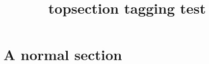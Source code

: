 \documentclass{article}
\title{topsection tagging test}
\begin{document}

\section{A normal section}
\end{document}
